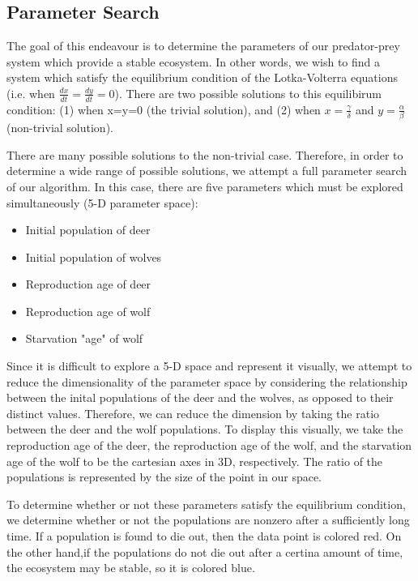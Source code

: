 \documentclass[a4paper,12pt]{article}
\begin{document}
\subsection{Parameter Search}
\indent
\indent The goal of this endeavour is to determine the parameters of our predator-prey system which provide a stable ecosystem.  In other words, we wish to find a 
system which satisfy the equilibrium condition of the Lotka-Volterra equations (i.e. when $\frac{dx}{dt} = \frac{dy}{dt} = 0$).  There are two possible solutions to 
this equilibirum condition: (1) when x=y=0 (the trivial solution), and (2) when $x=\frac{\gamma}{\delta}$ and $y=\frac{\alpha}{\beta}$ (non-trivial solution).  

There are many possible solutions to the non-trivial case.  Therefore, in order to determine a wide range of possible solutions, we attempt a full parameter search 
of our algorithm.  In this case, there are five parameters which must be explored simultaneously (5-D parameter space):
\begin{itemize}
  \item{Initial population of deer}
  \item{Initial population of wolves}
  \item{Reproduction age of deer}
  \item{Reproduction age of wolf}
  \item{Starvation "age" of wolf}
\end{itemize}
Since it is difficult to explore a 5-D space and represent it visually, we attempt to reduce the dimensionality of the parameter space by considering the 
relationship between the inital populations of the deer and the wolves, as opposed to their distinct values.  Therefore, we can reduce the dimension by taking 
the ratio between the deer and the wolf populations.  To display this visually, we take the reproduction age of the deer, the reproduction age of the wolf, and 
the starvation age of the wolf to be the cartesian axes in 3D, respectively.  The ratio of the populations is represented by the size of the point in our space.

To determine whether or not these parameters satisfy the equilibrium condition, we determine whether or not the populations are nonzero after a sufficiently long time. 
If a population is found to die out, then the data point is colored red.  On the other hand,if the populations do not die out after a certina amount of time, the 
ecosystem may be stable, so it is colored blue.
\end{document}
